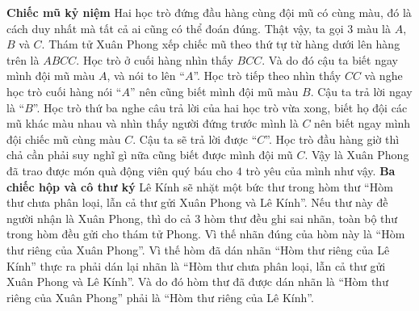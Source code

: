 \vskip 0.1cm
\textbf{\color{toancuabi}\color{toancuabi}Chiếc mũ kỷ niệm} 
\vskip 0.1cm
Hai học trò đứng đầu hàng cùng đội mũ có cùng màu, đó là cách duy nhất mà tất cả ai cũng có thể đoán đúng.
\vskip 0.1cm
Thật vậy, ta gọi $3$ màu là $A$, $B$ và $C$. Thám tử Xuân Phong xếp chiếc mũ theo thứ tự từ hàng dưới lên hàng trên là $ABCC$. Học trò ở cuối hàng nhìn thấy $BCC$. Và do đó cậu ta biết ngay mình đội mũ màu $A$, và nói to lên “$A$”.
\vskip 0.1cm
Học trò tiếp theo nhìn thấy $CC$ và nghe học trò cuối hàng nói “$A$” nên cũng biết mình đội mũ màu $B$. Cậu ta trả lời ngay là “$B$”.
\vskip 0.1cm
Học trò thứ ba nghe câu trả lời của hai học trò vừa xong, biết họ đội các mũ khác màu nhau và nhìn thấy người đứng trước mình là $C$ nên biết ngay mình đội chiếc mũ cùng màu $C$. Cậu ta sẽ trả lời được “$C$”.
\vskip 0.1cm
Học  trò đầu hàng giờ thì chả cần phải suy nghĩ gì nữa cũng biết được mình đội mũ $C$. Vậy là Xuân Phong đã trao được món quà động viên quý báu cho $4$ trò yêu của mình như vậy.
\vskip 0.1cm
\textbf{\color{toancuabi}\color{toancuabi}Ba chiếc hộp và cô thư ký}
\vskip 0.1cm
Lê Kính sẽ nhặt một bức thư trong hòm thư “Hòm thư chưa phân loại, lẫn cả thư gửi Xuân Phong và Lê Kính”. Nếu thư này đề người nhận là Xuân Phong, thì do cả $3$ hòm thư đều ghi sai nhãn, toàn bộ thư trong hòm đều gửi cho thám tử Phong. Vì thế nhãn đúng của hòm này là “Hòm thư riêng của Xuân Phong”.
\vskip 0.1cm
Vì thế hòm đã dán nhãn “Hòm thư riêng của Lê Kính” thực ra phải dán lại nhãn là “Hòm thư chưa phân loại, lẫn cả thư gửi Xuân Phong và Lê Kính”.
\vskip 0.1cm
Và do đó hòm thư đã được dán nhãn là “Hòm thư riêng của Xuân Phong” phải là “Hòm thư riêng của Lê Kính”.
\vskip 0.1cm

